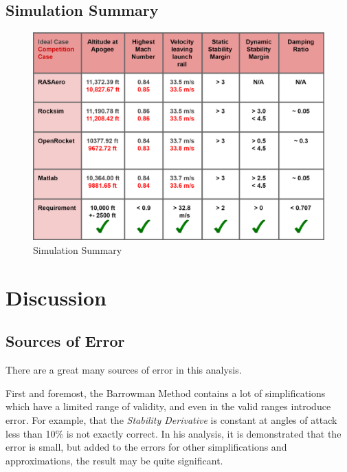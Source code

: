 \documentclass[]{article}
\begin{document}
\clearpage

\subsection{Simulation Summary}\label{simulation-summary}

\begin{figure}[htbp]
\centering
\includegraphics{images/simulation_summary.png}
\caption{Simulation Summary \label{plt_simulation_summary}}
\end{figure}

\clearpage

\section{Discussion}\label{discussion}

\subsection{Sources of Error}\label{sources-of-error}

There are a great many sources of error in this analysis.

First and foremost, the Barrowman Method contains a lot of
simplifications which have a limited range of validity, and even in the
valid ranges introduce error. For example, that the \emph{Stability
Derivative} is constant at angles of attack less than 10\% is not
exactly correct. In his analysis, it is demonstrated that the error is
small, but added to the errors for other simplifications and
approximations, the result may be quite significant.
\end{document}
